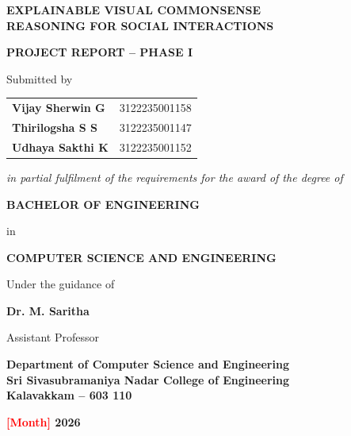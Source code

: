 \documentclass[12pt,a4paper,oneside]{report}
\newcommand{\fillin}[1]{\textcolor{red}{[#1]}}
\newcommand{\guidename}{Dr. M. Saritha}
\newcommand{\guidedesig}{Assistant Professor}
\newcommand{\reportmonth}{\fillin{Month} 2026}
\begin{document}
\begin{titlepage}
\begin{center}
\vspace*{0.5cm}
{\LARGE\bfseries EXPLAINABLE VISUAL COMMONSENSE\\[4pt]
REASONING FOR SOCIAL INTERACTIONS\par}
\vspace{1.2cm}
{\large\bfseries PROJECT REPORT -- PHASE I\par}
\vspace{1.2cm}
{\large Submitted by\par}
\vspace{0.4cm}
\begin{tabular}{ll}
\textbf{Vijay Sherwin G}   & 3122235001158\\
\textbf{Thirilogsha S S}   & 3122235001147\\
\textbf{Udhaya Sakthi K}   & 3122235001152\\
\end{tabular}

\vspace{1.0cm}
{\large\itshape in partial fulfilment of the requirements for the award of the degree of\par}
\vspace{0.4cm}
{\Large\bfseries BACHELOR OF ENGINEERING\par}
\vspace{0.2cm}
{\large in\par}
\vspace{0.2cm}
{\Large\bfseries COMPUTER SCIENCE AND ENGINEERING\par}
\vspace{1.0cm}
{\large Under the guidance of\par}
\vspace{0.2cm}
{\large\bfseries \guidename\par}
{\large \guidedesig\par}
\vfill
{\large\bfseries Department of Computer Science and Engineering\\[2pt]
Sri Sivasubramaniya Nadar College of Engineering\\[2pt]
Kalavakkam -- 603 110\par}
\vspace{0.4cm}
{\large\bfseries \reportmonth\par}
\end{center}
\end{titlepage}
\end{document}
